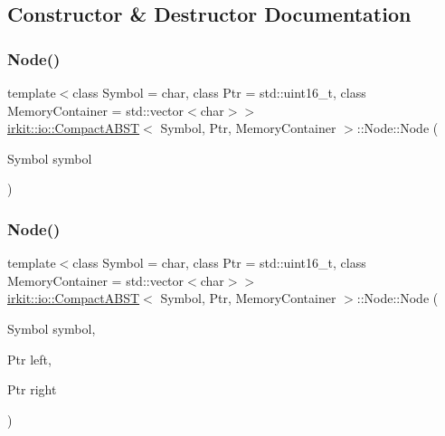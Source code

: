 \subsection{Constructor \& Destructor Documentation}
\mbox{\label{structirkit_1_1io_1_1CompactABST_1_1Node_a1f43366d4ce1025fe8bb0876f1e50972}} 
\subsubsection{\texorpdfstring{Node()}{Node()}\hspace{0.1cm}{\footnotesize\ttfamily [1/2]}}
{\footnotesize\ttfamily template$<$class Symbol = char, class Ptr = std\+::uint16\+\_\+t, class Memory\+Container = std\+::vector$<$char$>$$>$ \\
\mbox{\hyperlink{classirkit_1_1io_1_1CompactABST}{irkit\+::io\+::\+Compact\+A\+B\+ST}}$<$ Symbol, Ptr, Memory\+Container $>$\+::Node\+::\+Node (\begin{DoxyParamCaption}\item[{Symbol}]{symbol }\end{DoxyParamCaption})\hspace{0.3cm}{\ttfamily [inline]}}

\mbox{\label{structirkit_1_1io_1_1CompactABST_1_1Node_afb931dd304adcbc47ecf0078a865a930}} 
\subsubsection{\texorpdfstring{Node()}{Node()}\hspace{0.1cm}{\footnotesize\ttfamily [2/2]}}
{\footnotesize\ttfamily template$<$class Symbol = char, class Ptr = std\+::uint16\+\_\+t, class Memory\+Container = std\+::vector$<$char$>$$>$ \\
\mbox{\hyperlink{classirkit_1_1io_1_1CompactABST}{irkit\+::io\+::\+Compact\+A\+B\+ST}}$<$ Symbol, Ptr, Memory\+Container $>$\+::Node\+::\+Node (\begin{DoxyParamCaption}\item[{Symbol}]{symbol,  }\item[{Ptr}]{left,  }\item[{Ptr}]{right }\end{DoxyParamCaption})\hspace{0.3cm}{\ttfamily [inline]}}



